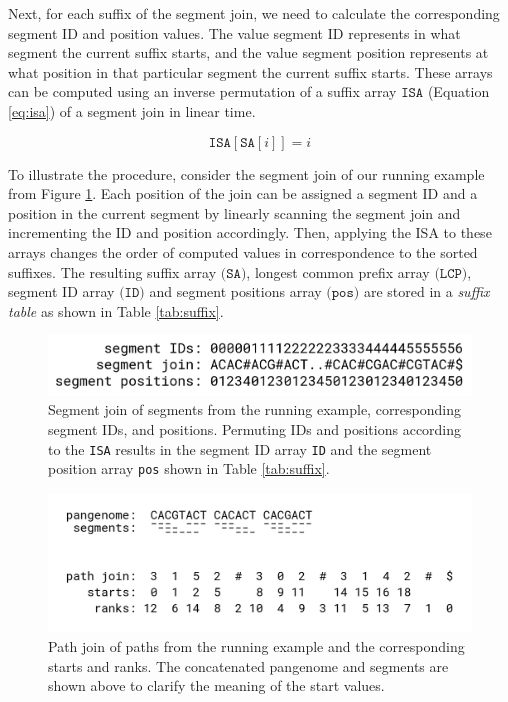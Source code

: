 Next, for each suffix of the segment join, we need to calculate the corresponding segment ID and position values.
The value segment ID represents in what segment the current suffix starts, and the value segment position represents at what position in that particular segment the current suffix starts.
These arrays can be computed using an inverse permutation of a suffix array $\texttt{ISA}$ (Equation \ref{eq:isa}) of a segment join in linear time.

\begin{equation}
    \label{eq:isa}
    \texttt{ISA}[\texttt{SA}[i]] = i
\end{equation}

To illustrate the procedure, consider the segment join of our running example from Figure \ref{fig:ids_and_positions}.
Each position of the join can be assigned a segment ID and a position in the current segment by linearly scanning the segment join and incrementing the ID and position accordingly.
Then, applying the ISA to these arrays changes the order of computed values in correspondence to the sorted suffixes.
The resulting suffix array $\texttt{(SA)}$, longest common prefix array $\texttt{(LCP)}$, segment ID array $\texttt{(ID)}$ and segment positions array $\texttt{(pos)}$ are stored in a \emph{suffix table} as shown in Table \ref{tab:suffix}.

\begin{figure}
    \centering
    \includegraphics[width=\linewidth]{images/ids_and_positions.png}
    \caption{
    Segment join of segments from the running example, corresponding segment IDs, and positions. Permuting IDs and positions according to the \texttt{ISA} results in the segment ID array \texttt{ID} and the segment position array \texttt{pos} shown in Table \ref{tab:suffix}. \label{fig:ids_and_positions}
    }
\end{figure}





\begin{figure}
    \centering
    \includegraphics[width=\linewidth]{images/path_join.png}
    \caption{
    Path join of paths from the running example and the corresponding starts and ranks. The concatenated pangenome and segments are shown above to clarify the meaning of the start values. \label{fig:path_join}
    }
\end{figure}

